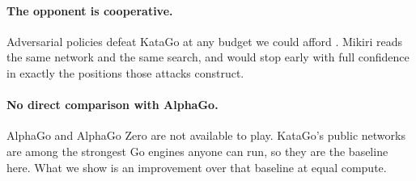 \paragraph{The opponent is cooperative.}
Adversarial policies defeat KataGo at any budget we could afford \citep{wang2023adversarial,tseng2025can}. Mikiri reads the same network and the same search, and would stop early with full confidence in exactly the positions those attacks construct.

\paragraph{No direct comparison with AlphaGo.}
AlphaGo and AlphaGo Zero \citep{silver2016mastering,silver2017mastering} are not available to play. KataGo's public networks are among the strongest Go engines anyone can run, so they are the baseline here. What we show is an improvement over that baseline at equal compute.
